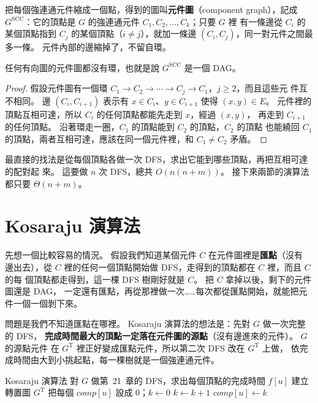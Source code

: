 把每個強連通元件縮成一個點，得到的圖叫\textbf{元件圖}（component graph），記成
$G^{\mathrm{SCC}}$：它的頂點是 $G$ 的強連通元件 $C_1, C_2, \ldots, C_k$；只要 $G$ 裡
有一條邊從 $C_i$ 的某個頂點指到 $C_j$ 的某個頂點（$i \ne j$），就加一條邊 $(C_i,
C_j)$，同一對元件之間最多一條。 元件內部的邊縮掉了，不留自環。

\begin{lemma}
\label{lem:con-dag}
任何有向圖的元件圖都沒有環，也就是說 $G^{\mathrm{SCC}}$ 是一個 DAG。
\end{lemma}

\begin{proof}
假設元件圖有一個環 $C_1 \to C_2 \to \cdots \to C_j \to C_1$，$j \ge 2$，而且這些元
件互不相同。 邊 $(C_i, C_{i+1})$ 表示有 $x \in C_i$、$y \in C_{i+1}$ 使得 $(x, y)
\in E$。 元件裡的頂點互相可達，所以 $C_i$ 的任何頂點都能先走到 $x$，經過 $(x, y)$，
再走到 $C_{i+1}$ 的任何頂點。 沿著環走一圈，$C_1$ 的頂點能到 $C_2$ 的頂點，$C_2$ 的頂點
也能繞回 $C_1$ 的頂點，兩者互相可達，應該在同一個元件裡，和 $C_1 \ne C_2$ 矛盾。
\end{proof}

最直接的找法是從每個頂點各做一次 DFS，求出它能到哪些頂點，再把互相可達的配對起
來。 這要做 $n$ 次 DFS，總共 $O(n(n + m))$。 接下來兩節的演算法都只要 $\Theta(n + m)$。

\section{Kosaraju 演算法}
\label{sec:con-kosaraju}

先想一個比較容易的情況。 假設我們知道某個元件 $C$ 在元件圖裡是\textbf{匯點}（沒有
邊出去），從 $C$ 裡的任何一個頂點開始做 DFS，走得到的頂點都在 $C$ 裡，而且 $C$ 的每
個頂點都走得到，這一棵 DFS 樹剛好就是 $C$。 把 $C$ 拿掉以後，剩下的元件圖還是 DAG，
一定還有匯點，再從那裡做一次……每次都從匯點開始，就能把元件一個一個剝下來。

問題是我們不知道匯點在哪裡。 Kosaraju 演算法的想法是：先對 $G$ 做一次完整的 DFS，
\textbf{完成時間最大的頂點一定落在元件圖的源點}（沒有邊進來的元件）。 $G$ 的源點元件
在 $G^{\mathrm{T}}$ 裡正好變成匯點元件，所以第二次 DFS 改在 $G^{\mathrm{T}}$ 上做，
依完成時間由大到小挑起點，每一棵樹就是一個強連通元件。

\begin{pseudo}[label=alg:con-kosaraju]{Kosaraju 演算法}
    \State 對 $G$ 做第~21~章的 DFS，求出每個頂點的完成時間 $f[u]$
    \State 建立轉置圖 $G^{\mathrm{T}}$
    \State 把每個 $\mathit{comp}[u]$ 設成 $0$；$k \gets 0$
            \State $k \gets k + 1$
            \State {}
        \EndIf
    \EndFor
\EndProcedure
{}
    \State $\mathit{comp}[u] \gets k$ 
            \State {}
        \EndIf
    \EndFor
\EndProcedure
\end{pseudo}

